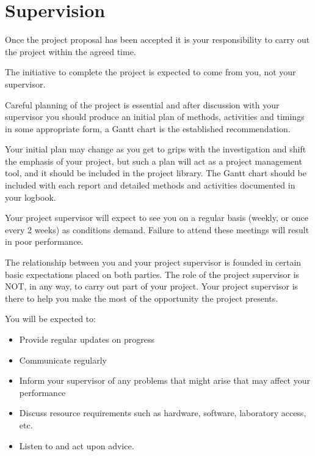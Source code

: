 \chapter{Supervision}

Once the project proposal has been accepted it is your responsibility to carry out the project within the agreed time.

\begin{tcolorbox}
    The initiative to complete the project is expected to come from you, not your supervisor.
\end{tcolorbox}

Careful planning of the project is essential and after discussion with your supervisor you should produce an initial plan of methods, activities and timings in some appropriate form, a Gantt chart is the established recommendation.

Your initial plan may change as you get to grips with the investigation and shift the emphasis of your project, but such a plan will act as a project management tool, and it should be included in the project library. The Gantt chart should be included with each report and detailed methods and activities documented in your logbook.

\begin{tcolorbox}
    Your project supervisor will expect to see you on a regular basis (weekly, or once every 2 weeks) as conditions demand. Failure to attend these meetings will result in poor performance.
\end{tcolorbox}

The relationship between you and your project supervisor is founded in certain basic expectations placed on both parties. The role of the project supervisor is NOT, in any way, to carry out part of your project. Your project supervisor is there to help you make the most of the opportunity the project presents.

You will be expected to:

\begin{itemize}
    \item Provide regular updates on progress
    \item Communicate regularly
    \item Inform your supervisor of any problems that might arise that may affect your performance
    \item Discuss resource requirements such as hardware, software, laboratory access, etc.
    \item Listen to and act upon advice.
\end{itemize}

